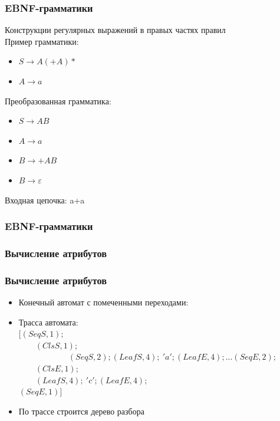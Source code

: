 \documentclass{beamer}
\begin{document}
\begin{frame}
    \transwipe[direction=90]
    \frametitle{EBNF-грамматики}
    Конструкции регулярных выражений в правых частях правил
  \\
    Пример грамматики: 
        \begin{itemize}
            \item $S \rightarrow A(+A)*$
            \item $A \rightarrow a$
        \end{itemize}
    Преобразованная грамматика:
  \begin{itemize}
        \item $S \rightarrow AB$
        \item $A \rightarrow a$
        \item $B \rightarrow +AB$       
        \item $B \rightarrow \varepsilon$
    \end{itemize}
    Входная цепочка: a+a

\end{frame}

\begin{frame}[t]
    \transwipe[direction=90]
    \frametitle{EBNF-грамматики}
   
\end{frame}

\begin{frame}
    \transwipe[direction=90]
    \frametitle{Вычисление атрибутов}
  
\end{frame}

\begin{frame}
    \transwipe[direction=90]
    \frametitle{Вычисление атрибутов}
  \begin{itemize}
   \item
    Конечный автомат с помеченными переходами:\\
   \item
    Трасса автомата: \\
    $[(SeqS,1);$\\             
    $\phantom \qquad(ClsS,1);$\\
    $\phantom \qquad \qquad \qquad (SeqS,2); (LeafS,4); \ 'a'; (LeafE,4); ... (SeqE,2);$ \\ 
    $\phantom \qquad (ClsE,1); $\\
    $\phantom \qquad (LeafS,4); \ 'c'; (LeafE,4);$\\
    $(SeqE,1)]$
   \item
    По трассе строится дерево разбора
  \end{itemize}
\end{frame}
\end{document}
